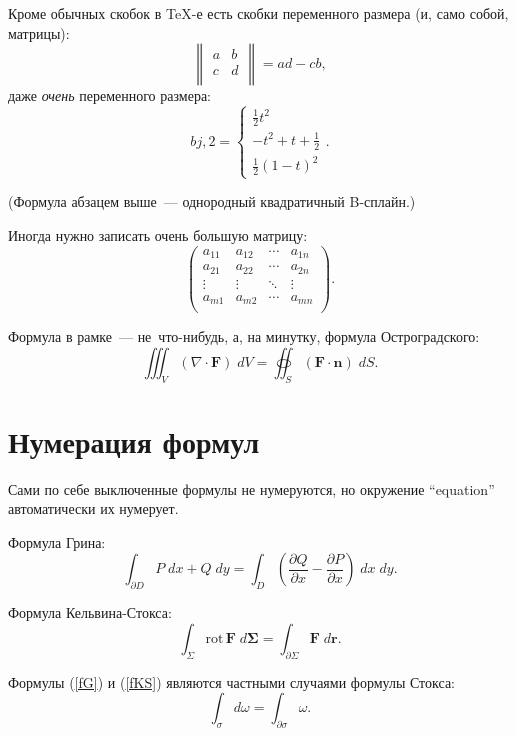 \documentclass[12pt]{article}
\begin{document}
Кроме обычных скобок в \TeX-е есть скобки переменного размера (и, само собой, матрицы):
$$\left\| \begin{array}{cc}%
	a & b \\%
	c & d \\%
\end{array}\right\| = ad - cb,$$
даже \emph{очень} переменного размера:
$$b{j,2} = \left\{ \begin{array}{l}%
	\frac12 t^2 \\
	-t^2 + t + \frac12 \\
	\frac12 (1 - t)^2
\end{array}\right..$$

(Формула абзацем выше~--- однородный квадратичный B-сплайн.)

Иногда нужно записать очень большую матрицу:
$$\left(\begin{array}{cccc}
	a_{11} & a_{12} & \cdots & a_{1n} \\
	a_{21} & a_{22} & \cdots & a_{2n} \\
	\vdots & \vdots & \ddots & \vdots \\
	a_{m1} & a_{m2} & \cdots & a_{mn} \\
\end{array}\right).$$

Формула в рамке~--- не~что-нибудь, а, на минутку, формула Остроградского:
$$\boxed{\iiint_V (\nabla \cdot \mathbf F)\;dV = \oiint_S (\mathbf F \cdot \mathbf n)\;dS}.$$

\section{Нумерация формул}

Сами по себе выключенные формулы не нумеруются, но окружение \enquote{equation} автоматически их нумерует.

Формула Грина:
\begin{equation}
\label{fG}
\int_{\partial D} P\;dx + Q\;dy = \int_D \left( \frac{\partial Q}{\partial x} - \frac{\partial P}{\partial x} \right)\;dx\;dy.
\end{equation}

Формула Кельвина-Стокса:
\begin{equation}
\label{fKS}
\int_\Sigma \mathrm{rot}\,\mathbf F\;d\mathbf \Sigma = \int_{\partial\Sigma} \mathbf F\;d\mathbf r.
\end{equation}

Формулы (\ref{fG}) и (\ref{fKS}) являются частными случаями формулы Стокса:
\begin{equation}
\int_\sigma d\omega = \int_{\partial \sigma} \omega.
\end{equation}
\end{document}
